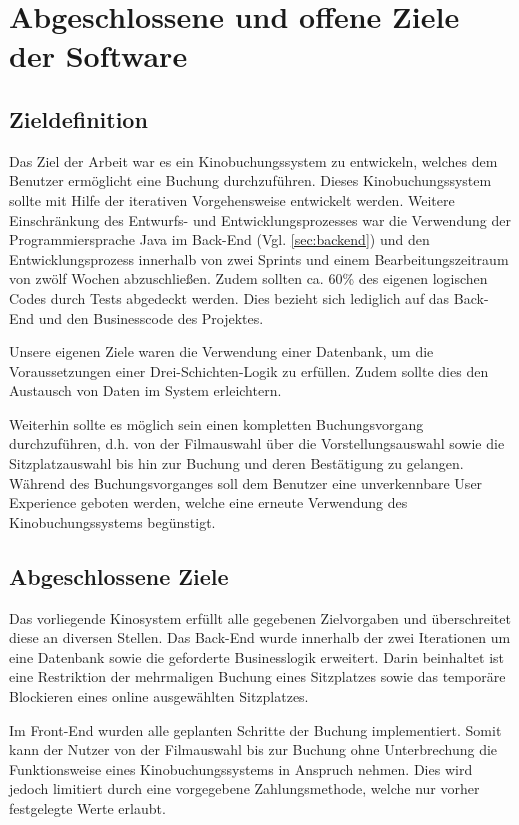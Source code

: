 \section{Abgeschlossene und offene Ziele der Software}
\label{sec:ziele}
\subsection{Zieldefinition}
Das Ziel der Arbeit war es ein Kinobuchungssystem zu entwickeln, welches dem Benutzer ermöglicht eine Buchung durchzuführen.
Dieses Kinobuchungssystem sollte mit Hilfe der iterativen Vorgehensweise entwickelt werden.
Weitere Einschränkung des Entwurfs- und Entwicklungsprozesses war die Verwendung der Programmiersprache Java im Back-End (Vgl. \vref{sec:backend}) und den Entwicklungsprozess innerhalb von zwei Sprints und einem Bearbeitungszeitraum von zwölf Wochen abzuschließen.
Zudem sollten ca. 60\% des eigenen logischen Codes durch Tests abgedeckt werden. Dies bezieht sich lediglich auf das Back-End und den Businesscode des Projektes.

Unsere eigenen Ziele waren die Verwendung einer Datenbank, um die Voraussetzungen einer Drei-Schichten-Logik zu erfüllen.
Zudem sollte dies den Austausch von Daten im System erleichtern.

Weiterhin sollte es möglich sein einen kompletten Buchungsvorgang durchzuführen, d.h. von der Filmauswahl über die Vorstellungsauswahl sowie die Sitzplatzauswahl bis hin zur Buchung und deren Bestätigung zu gelangen.
Während des Buchungsvorganges soll dem Benutzer eine unverkennbare User Experience geboten werden, welche eine erneute Verwendung des Kinobuchungssystems begünstigt.

\subsection{Abgeschlossene Ziele}
Das vorliegende Kinosystem erfüllt alle gegebenen Zielvorgaben und überschreitet diese an diversen Stellen.
Das Back-End wurde innerhalb der zwei Iterationen um eine Datenbank sowie die geforderte Businesslogik erweitert. Darin beinhaltet ist eine Restriktion der mehrmaligen Buchung eines Sitzplatzes sowie das temporäre Blockieren eines online ausgewählten Sitzplatzes.

Im Front-End wurden alle geplanten Schritte der Buchung implementiert. Somit kann der Nutzer von der Filmauswahl bis zur Buchung ohne Unterbrechung die Funktionsweise eines Kinobuchungssystems in Anspruch nehmen. Dies wird jedoch limitiert durch eine vorgegebene Zahlungsmethode, welche nur vorher festgelegte Werte erlaubt.

